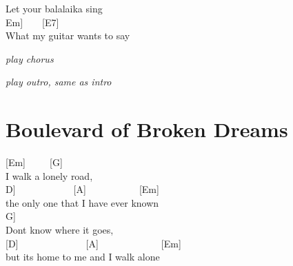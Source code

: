 \documentclass[
  letterpaper,
  a5paper]{memoir}
\begin{document}
Let your balalaika sing\\
\hspace*{0.333em}\hspace*{0.333em}\hspace*{0.333em}\hspace*{0.333em}\hspace*{0.333em}\hspace*{0.333em}\hspace*{0.333em}\hspace*{0.333em}\hspace*{0.333em}\hspace*{0.333em}\hspace*{0.333em}\hspace*{0.333em}\hspace*{0.333em}\hspace*{0.333em}\hspace*{0.333em}\hspace*{0.333em}\hspace*{0.333em}\hspace*{0.333em}\hspace*{0.333em}\hspace*{0.333em}\hspace*{0.333em}\hspace*{0.333em}\hspace*{0.333em}{[}Em{]}~~~~{[}E7{]}\\
What my guitar wants to say

\emph{play chorus}

\emph{play outro, same as intro}

\hypertarget{boulevard-of-broken-dreams}{%
\chapter{Boulevard of Broken Dreams}\label{boulevard-of-broken-dreams}}

{[}Em{]}~~~~~{[}G{]}~~~~~~~~~~\\
I walk a lonely road,\\
\hspace*{0.333em}\hspace*{0.333em}{[}D{]}~~~~~~~~~~~~{[}A{]}~~~~~~~~~~~{[}Em{]}\\
the only one that I have ever known\\
\hspace*{0.333em}\hspace*{0.333em}\hspace*{0.333em}\hspace*{0.333em}\hspace*{0.333em}\hspace*{0.333em}\hspace*{0.333em}\hspace*{0.333em}\hspace*{0.333em}\hspace*{0.333em}\hspace*{0.333em}{[}G{]}~~~~~~~~~~~\\
Don\textquotesingle t know where it goes,\\
{[}D{]}~~~~~~~~~~~~~~{[}A{]}~~~~~~~~~~~~~{[}Em{]}\\
but it\textquotesingle s home to me and I walk alone
\end{document}
